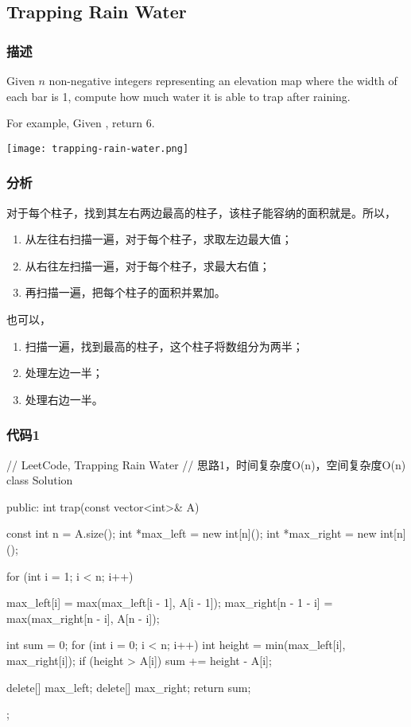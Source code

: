 \subsection{Trapping Rain Water} %
\label{sec:trapping-rain-water}


\subsubsection{描述}
Given $n$ non-negative integers representing an elevation map where the width of each bar is 1, compute how much water it is able to trap after raining.

For example, 
Given \code{[0,1,0,2,1,0,1,3,2,1,2,1]}, return 6.

\begin{center}
\texttt{[image: trapping-rain-water.png]}\\
\label{fig:trapping-rain-water}
\end{center}


\subsubsection{分析}
对于每个柱子，找到其左右两边最高的柱子，该柱子能容纳的面积就是。所以，
\begin{enumerate}
\item 从左往右扫描一遍，对于每个柱子，求取左边最大值；
\item 从右往左扫描一遍，对于每个柱子，求最大右值；
\item 再扫描一遍，把每个柱子的面积并累加。
\end{enumerate}

也可以，
\begin{enumerate}
\item 扫描一遍，找到最高的柱子，这个柱子将数组分为两半；
\item 处理左边一半；
\item 处理右边一半。
\end{enumerate}


\subsubsection{代码1}
\begin{Code}
// LeetCode, Trapping Rain Water
// 思路1，时间复杂度O(n)，空间复杂度O(n)
class Solution {
public:
    int trap(const vector<int>& A) {
        const int n = A.size();
        int *max_left = new int[n]();
        int *max_right = new int[n]();

        for (int i = 1; i < n; i++) {
            max_left[i] = max(max_left[i - 1], A[i - 1]);
            max_right[n - 1 - i] = max(max_right[n - i], A[n - i]);

        }

        int sum = 0;
        for (int i = 0; i < n; i++) {
            int height = min(max_left[i], max_right[i]);
            if (height > A[i]) {
                sum += height - A[i];
            }
        }

        delete[] max_left;
        delete[] max_right;
        return sum;
    }
};
\end{Code}


